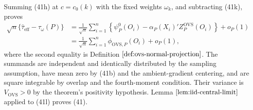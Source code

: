 Summing (41h) at \(c=c_0(k)\) with the fixed weights \(\omega_k\), and subtracting (41k), proves
\[
\begin{aligned}
\sqrt n\{\widehat\tau_{\mathrm{eff}}-\tau_\omega(P)\}
&=\frac1{\sqrt n}\sum_{i=1}^n
\left\{\psi_P^0(O_i)-\alpha_P(X_i)'Z_P^{\mathrm{OVS}}(O_i)\right\}+o_P(1)\\
&=\frac1{\sqrt n}\sum_{i=1}^n\phi_{\mathrm{OVS},P}(O_i)+o_P(1),
\end{aligned}
\tag{41l}
\]
where the second equality is Definition \(\ref{def:ovs-normal-projection}\).  The summands are independent and identically distributed by the sampling assumption, have mean zero by (41b) and the ambient-gradient centering, and are square integrable by overlap and the fourth-moment condition.  Their variance is \(V_{\mathrm{OVS}}>0\) by the theorem's positivity hypothesis.  Lemma \(\ref{lem:iid-central-limit}\) applied to (41l) proves (41).

